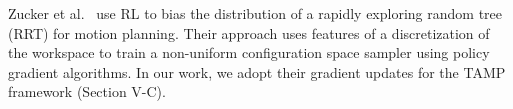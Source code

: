Zucker et al.~\cite{workspacebias} use RL to bias the distribution of a rapidly exploring random tree (RRT)
for motion planning. Their approach uses features of a discretization of the workspace to train
a non-uniform configuration space sampler using policy gradient algorithms.
In our work, we adopt their gradient updates for the TAMP framework (Section V-C).
